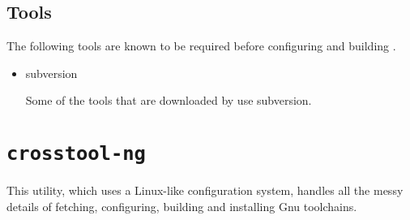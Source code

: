 \subsection{Tools}

The following tools are known to be required before configuring and
building \ctng.

\begin{itemize}
\item{subversion}

  Some of the tools that are downloaded by \ctng use subversion.

\end{itemize}

\section{\texttt{crosstool-ng}}\label{toolchain-config:install-ctng}

This utility, which uses a Linux-like configuration system, handles
all the messy details of fetching, configuring, building and
installing Gnu toolchains.

